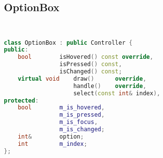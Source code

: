 \subsection{OptionBox}
\begin{lstlisting}[language=C++]


class OptionBox : public Controller {
public:
    bool        isHovered() const override,
                isPressed() const,
                isChanged() const;
    virtual void    draw()      override,
                    handle()    override,
                    select(const int& index),
protected:
    bool        m_is_hovered,
                m_is_pressed,
                m_is_focus,
                m_is_changed;
    int&        option;
    int         m_index;
};





\end{lstlisting}
